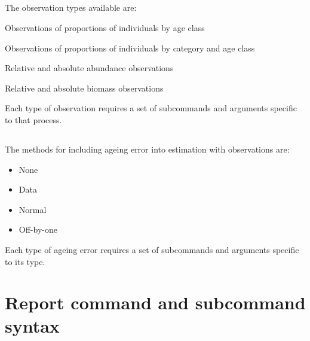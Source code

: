 
\subsection{}

The observation types available are:

\begin{description}
  \item Observations of proportions of individuals by age class
  \item Observations of proportions of individuals by category and age class
  \item Relative and absolute abundance observations
  \item Relative and absolute biomass observations
\end{description}

Each type of observation requires a set of subcommands and arguments specific to that process.



\subsection{}


\subsection{}

The methods for including ageing error into estimation with observations are:

\begin{itemize}
	\item None
	\item Data
	\item Normal
	\item Off-by-one
\end{itemize}

Each type of ageing error requires a set of subcommands and arguments specific to its type.



\section{Report command and subcommand syntax\label{sec:report-syntax}}
\subsection{}

